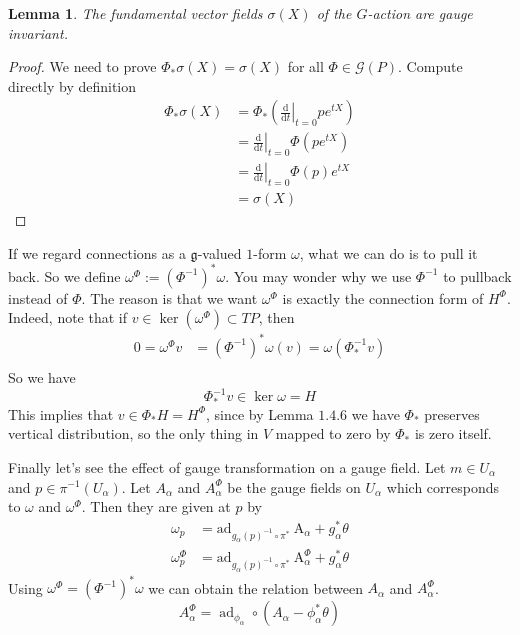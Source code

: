 \documentclass[11pt]{amsart}
\numberwithin{equation}{section}
\theoremstyle{plain}
\theoremstyle{plain}
\newtheorem{lemmasub}[thmsub]{Lemma}
\numberwithin{equation}{section}
\begin{document}
\begin{lemmasub}
The fundamental vector fields $\sigma(X)$ of the $G$-action are gauge invariant.
\end{lemmasub}
\begin{proof}
We need to prove $\Phi_*\sigma(X)=\sigma(X)$ for all $\Phi\in\mathscr{G}(P)$. Compute directly by definition
$$
\begin{aligned}
\Phi_*\sigma(X)&=\Phi_*(\left.\frac{\mathrm{d}}{\mathrm{d}t}\right|_{t=0}pe^{tX})\\
&=\left.\frac{\mathrm{d}}{\mathrm{d}t}\right|_{t=0}\Phi(pe^{tX})\\
&=\left.\frac{\mathrm{d}}{\mathrm{d}t}\right|_{t=0}\Phi(p)e^{tX}\\
&=\sigma(X)
\end{aligned}
$$
\end{proof}

If we regard connections as a $\mathfrak{g}$-valued $1$-form $\omega$, what we can do is to pull it back. So we define $\omega^{\Phi}:=(\Phi^{-1})^{*}\omega$. You may wonder why we use $\Phi^{-1}$ to pullback instead of $\Phi$. The reason is that we want $\omega^{\Phi}$ is exactly the connection form of $H^{\Phi}$. Indeed, note that if $v\in\operatorname{ker}(\omega^{\Phi})\subset TP$, then
$$
\begin{aligned}
0=\omega^{\Phi}v&=(\Phi^{-1})^{*}\omega(v)=\omega(\Phi^{-1}_*v)\\
\end{aligned}
$$
So we have 
$$
\Phi^{-1}_*v\in\operatorname{ker}\omega=H
$$
This implies that $v\in \Phi_*H=H^{\Phi}$, since by Lemma $1.4.6$ we have $\Phi_*$ preserves vertical distribution, so the only thing in $V$ mapped to zero by $\Phi_*$ is zero itself.

Finally let's see the effect of gauge transformation on a gauge field. Let $m\in U_{\alpha}$ and $p\in\pi^{-1}(U_{\alpha})$. Let $A_{\alpha}$ and $A_{\alpha}^{\Phi}$ be the gauge fields on $U_{\alpha}$ which corresponds to $\omega$ and $\omega^{\Phi}$. Then they are given at $p$ by
$$
\begin{aligned}
\omega_{p} &=\mathrm{ad}_{g_{\alpha}(p)^{-1} \circ \pi^{*}} \mathrm{~A}_{\alpha}+g_{\alpha}^{*} \theta \\
\omega_{p}^{\Phi} &=\mathrm{ad}_{g_{\alpha}(p)^{-1} \circ \pi^{*}} \mathrm{~A}_{\alpha}^{\Phi}+g_{\alpha}^{*} \theta
\end{aligned}
$$
Using $\omega^{\Phi}=(\Phi^{-1})^*\omega$ we can obtain the relation between $A_{\alpha}$ and $A_{\alpha}^{\Phi}$.
$$
A^{\Phi}_{\alpha}=\operatorname{ad}_{\phi_{\alpha}}\circ(A_{\alpha}-\phi_{\alpha}^*\theta)
$$
\end{document}
